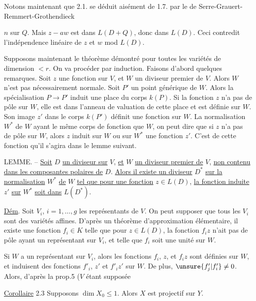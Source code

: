 Notons maintenant que 2.1.  se déduit aisément de 1.7. par le  de Serre-Grauert-Remmert-Grothendieck


$n$ sur $Q$. Mais $z-aw$ est dans $L(D+Q)$, donc dans $L(D)$. Ceci contredit l'indépendence linéaire de $z$ et $w$ mod $L(D)$.

Supposons maintenant le théorème démontré pour toutes les variétés de dimension $<r$. On va procéder par induction. Faisons d'abord quelques remarques. Soit $z$ une fonction sur $V$, et $W$ un diviseur premier de $V$. Alors $W$ n'est pas nécessairement normale. Soit $P'$ un point générique de $W$. Alors la spécialisation $P\longrightarrow P'$ induit une place du corps $k(P)$. Si la fonction $z$ n'a pas de pôle sur $W$, elle est dans l'anneau de valuation de cette place et est définie sur $W$. Son image $z'$ dans le corps $k(P')$ définit une fonction sur $W$. La normalisation $W^*$ de $W$ ayant le même corps de fonction que $W$, on peut dire que si $z$ n'a pas de pôle sur $W$, alors $z$ induit sur $W$ ou sur $W^*$ une fonction $z'$. C'est de cette fonction qu'il s'agira dans le lemme suivant.

LEMME. -- \uline{Soit} $D$ \uline{un diviseur sur} $V$, \uline{et} $W$ \uline{un diviseur premier de} $V$, \uline{non contenu dans les composantes polaires de} $D$. \uline{Alors il existe un diviseur} $D^*$ \uline{sur la normalisation} $W^*$ \uline{de} $W$ \uline{tel que pour une fonction} $z\in L(D)$, \uline{la fonction induite} $z'$ \uline{sur} $W^*$ \uline{soit dans} $L(D^*)$.

\uline{Dém}. Soit $V_i$, $i=1,\ldots,g$ les représentants de $V$. On peut supposer que tous les $V_i$ sont des variétés affines. D'après un théorème d'approximation élémentaire, il existe une fonction $f_i\in K$ telle que pour $z\in L(D)$, la fonction $f_i z$ n'ait pas de pôle ayant un représentant sur $V_i$, et telle que $f_i$ soit une unité sur $W$.

Si $W$ a un représentant sur $V_i$, alors les fonctions $f_i$, $z$, et $f_i z$ sont définies sur $W$, et induisent des fonctions $f'_i$, $z'$ et $f'_i z'$ sur $W$. De plus, $\unsure{f'_j|f'_i}\neq0$. Alors, d'après la prop.5 ($V$ étant supposée


\uline{Corollaire} 2.3 Supposons $\dim X_0\leq1$. Alors $X$ est projectif sur $Y$.

